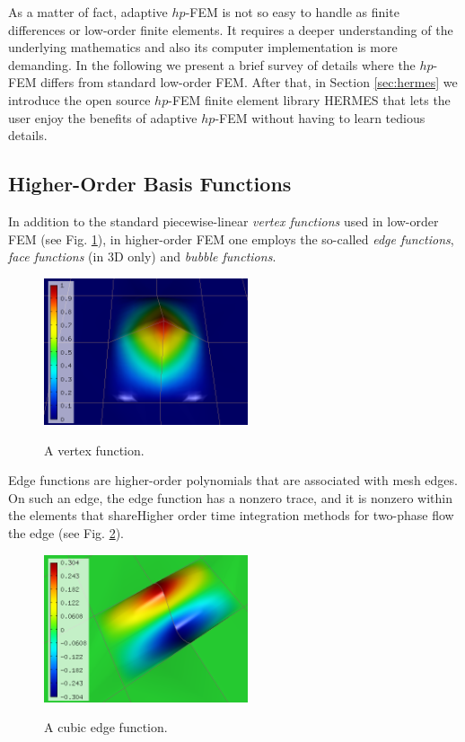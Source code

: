 \documentclass[final,3p,times,twocolumn]{elsarticle}
\begin{document}
As a matter of fact, adaptive $hp$-FEM is not so easy to handle 
as finite differences or low-order finite elements. It requires 
a deeper understanding of the underlying mathematics and also its 
computer implementation is more demanding. In the following 
we present a brief survey of details where the $hp$-FEM
differs from standard low-order FEM. After that, in Section 
\ref{sec:hermes} we introduce the open source $hp$-FEM finite 
element library HERMES that lets the user enjoy the benefits 
of adaptive $hp$-FEM without having to learn tedious details.

\subsection{Higher-Order Basis Functions}

In addition to the standard piecewise-linear
{\em vertex functions} used in low-order
FEM (see Fig. \ref{fig:vertex-fn}), 
in higher-order FEM one employs 
the so-called {\em edge functions}, 
{\em face functions} (in 3D only) and 
{\em bubble functions}.

\begin{figure}[!htb]
\begin{center}
 {
\includegraphics[width=6cm]{fn_vertex.png}
}
\end{center}
\caption{A vertex function.}
\label{fig:vertex-fn}
\end{figure}

Edge functions are higher-order polynomials
that are associated with mesh edges. On such 
an edge, the edge function has a nonzero trace,
and it is nonzero within the elements that shareHigher order time integration methods for two-phase flow
the edge (see Fig. \ref{fig:edge-fn}).

\begin{figure}[!htb]
\begin{center}
 {
\includegraphics[width=6cm]{fn_edge.png}
}
\end{center}
\caption{A cubic edge function.}
\label{fig:edge-fn}
\end{figure}
\end{document}
